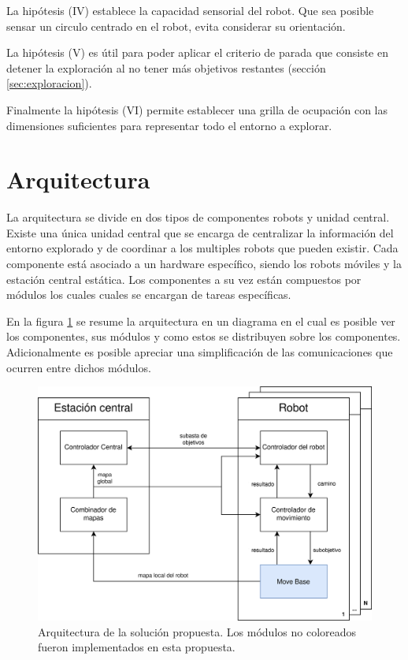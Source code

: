 La hipótesis (IV) establece la capacidad sensorial del robot. Que sea posible 
sensar un circulo centrado en el robot, evita considerar su orientación.

La hipótesis (V) es útil para poder aplicar el criterio de parada que consiste
en detener la exploración al no tener más objetivos restantes (sección
\ref{sec:exploracion}). 

Finalmente la hipótesis (VI) permite establecer una grilla de ocupación con las
dimensiones suficientes para representar todo el entorno a explorar. 

\section{Arquitectura}\label{sec:arqui}
La arquitectura se divide en dos tipos de componentes robots y unidad central.
Existe una única unidad central que se encarga de centralizar la información
del entorno explorado y de coordinar a los multiples robots que pueden existir.
Cada componente está asociado a un hardware específico, siendo los robots móviles
y la estación central estática. 
Los componentes a su vez están compuestos por módulos los cuales cuales se encargan
de tareas específicas. 

En la figura \ref{fig:arquitectura} se resume la arquitectura en un diagrama en
el cual es posible ver los componentes, sus módulos y como estos se distribuyen
sobre los componentes. Adicionalmente es posible apreciar una simplificación de las
comunicaciones que ocurren entre dichos módulos.


\begin{figure}[H]
  \center
  \includegraphics[width=1\linewidth]{imagenes/arquitectura.png}
  \caption[Arquitectura de la solucion propuesta.]{Arquitectura de la solución propuesta. Los módulos no coloreados fueron implementados en esta propuesta.}
  \label{fig:arquitectura}
\end{figure} 


